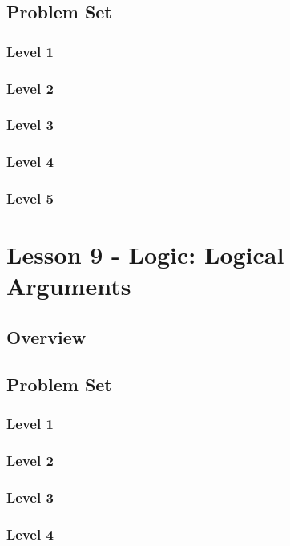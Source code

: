 \documentclass{article}
\begin{document}
\subsection{}
\subsection{Problem Set}
\subsubsection{Level 1}
\subsubsection{Level 2}
\subsubsection{Level 3}
\subsubsection{Level 4}
\subsubsection{Level 5}
\pagebreak

\section{Lesson 9 - Logic: Logical Arguments}
\subsection{Overview}
\subsection{Problem Set}
\subsubsection{Level 1}
\subsubsection{Level 2}
\subsubsection{Level 3}
\subsubsection{Level 4}
\end{document}
